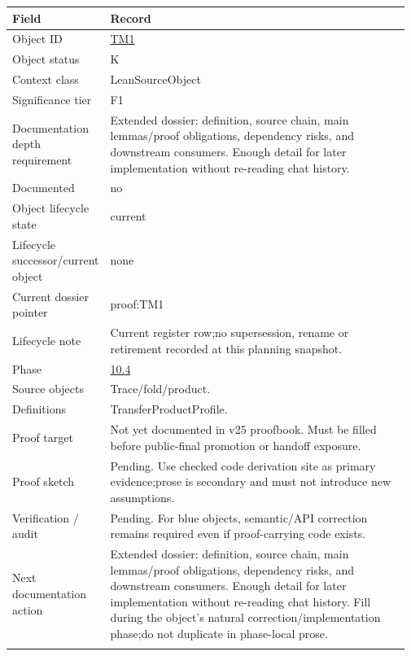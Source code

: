 \begin{longtable}{L{0.16\linewidth} L{0.81\linewidth}}
\hline
\textbf{Field} & \textbf{Record}\\
\hline
Object ID & \hyperlink{object-row-TM1}{TM1}\\
\hline\addlinespace[0.20em]
Object status & K\\
\hline\addlinespace[0.20em]
Context class & LeanSourceObject\\
\hline\addlinespace[0.20em]
Significance tier & F1\\
\hline\addlinespace[0.20em]
Documentation depth requirement & Extended dossier: definition, source chain, main lemmas/\allowbreak{}proof obligations, dependency risks, and downstream consumers. Enough detail for later implementation without re-reading chat history.\\
\hline\addlinespace[0.20em]
Documented & no\\
\hline\addlinespace[0.20em]
Object lifecycle state & current\\
\hline\addlinespace[0.20em]
Lifecycle successor/\allowbreak{}current object & none\\
\hline\addlinespace[0.20em]
Current dossier pointer & proof:TM1\\
\hline\addlinespace[0.20em]
Lifecycle note & Current register row;\newline no supersession, rename or retirement recorded at this planning snapshot.\\
\hline\addlinespace[0.20em]
Phase & \hyperlink{phase-row-10-4}{10.4}\\
\hline\addlinespace[0.20em]
Source objects & Trace/\allowbreak{}fold/\allowbreak{}product.\\
\hline\addlinespace[0.20em]
Definitions & TransferProductProfile.\\
\hline\addlinespace[0.20em]
Proof target & Not yet documented in v25 proofbook. Must be filled before public-final promotion or handoff exposure.\\
\hline\addlinespace[0.20em]
Proof sketch & Pending. Use checked code derivation site as primary evidence;\newline prose is secondary and must not introduce new assumptions.\\
\hline\addlinespace[0.20em]
Verification /\allowbreak{} audit & Pending. For blue objects, semantic/\allowbreak{}API correction remains required even if proof-carrying code exists.\\
\hline\addlinespace[0.20em]
Next documentation action & Extended dossier: definition, source chain, main lemmas/\allowbreak{}proof obligations, dependency risks, and downstream consumers. Enough detail for later implementation without re-reading chat history. Fill during the object's natural correction/\allowbreak{}implementation phase;\newline do not duplicate in phase-local prose.\\
\hline\addlinespace[0.20em]
\end{longtable}
